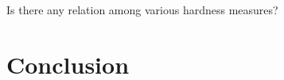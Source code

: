 \documentclass[]{book}
\begin{document}
\begin{quest}\label{que:q1}
      Is there any relation among various hardness measures?
\end{quest}

\section{Conclusion}
\label{sec:Conclusion}

\newpage


\end{document}
